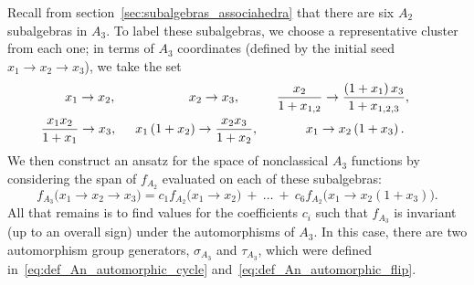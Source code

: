 \documentclass[12pt]{article}
\begin{document}
Recall from section~\ref{sec:subalgebras_associahedra} that there are six $A_2$ subalgebras in $A_3$. To label these subalgebras, we choose a representative cluster from each one; in terms of $A_3$ coordinates (defined by the initial seed $x_1 \to x_2 \to x_3$), we take the set
\begin{gather}
	x_1 \to x_2, \hspace{2cm}
	x_2 \to x_3, \hspace{1cm}
	\frac{x_2}{1+x_{1,2}} \to \frac{\left(1+x_1\right) x_3}{1+x_{1,2,3}},  \\
	\frac{x_1 x_2}{1+x_1} \to x_3, \hspace{.5cm}
	x_1 \left(1+x_2\right) \to \frac{x_2 x_3}{1+x_2}, \hspace{1.3cm}
	x_1 \to x_2 \left(1+x_3\right). \hspace{.8cm}  \label{eq:a2-in-a3}
\end{gather}
We then construct an ansatz for the space of nonclassical $A_3$ functions by considering the span of $f_{A_2}$ evaluated on each of these subalgebras:
\begin{equation}\label{eq:fa3-ansatz}
	f_{A_3}\big(x_1\to x_2\to x_3 \big) = c_1 f_{A_2}\big(x_1 \to x_2\big) \ +\ \ldots \ +\ c_6 f_{A_2}\big(x_1\to x_2 \left(1+x_3\right)\big).
\end{equation}	
All that remains is to find values for the coefficients $c_i$ such that $f_{A_3}$ is invariant (up to an overall sign) under the automorphisms of $A_3$. In this case, there are two automorphism group generators, $\sigma_{A_3}$ and $\tau_{A_3}$, which were defined in~\eqref{eq:def_An_automorphic_cycle} and~\eqref{eq:def_An_automorphic_flip}.  
\end{document}
